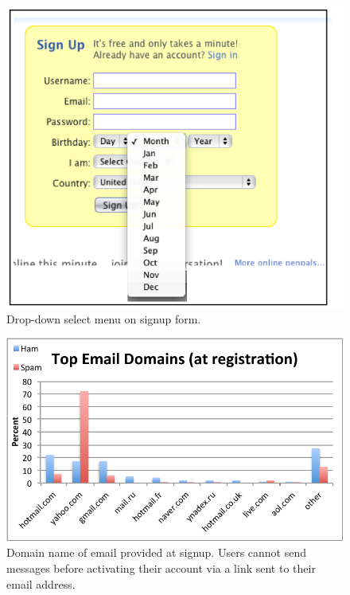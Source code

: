 \documentclass[preprint]{acm_proc_article-sp}
\begin{document}
\begin{figure}[h]
    \centering
    \includegraphics[width=\linewidth]{figures/dropdown.png}
    \caption{Drop-down select menu on signup form.}
    \label{fig:drop}
\end{figure}

\begin{figure}[h]
    \centering
    \includegraphics[width=\linewidth]{figures/email.pdf}
    \caption{Domain name of email provided at signup. Users cannot send messages before 
        activating their account via a link sent to their email address.}
    \label{fig:email}
\end{figure}
\end{document}
